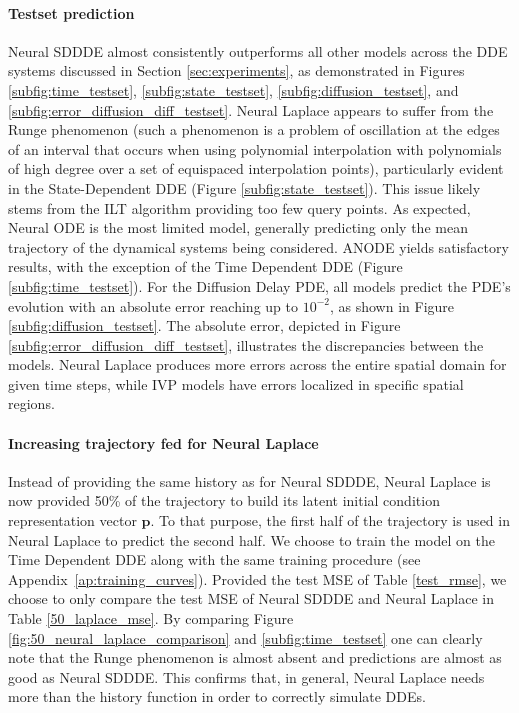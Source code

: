 \documentclass[pmlr]{jmlr}%
\begin{document}

\paragraph{Testset prediction} Neural SDDDE almost consistently outperforms all other models across the DDE systems discussed in Section \ref{sec:experiments}, as demonstrated in Figures \ref{subfig:time_testset}, \ref{subfig:state_testset}, \ref{subfig:diffusion_testset}, and \ref{subfig:error_diffusion_diff_testset}. Neural Laplace appears to suffer from the Runge phenomenon (such a phenomenon is a
problem of oscillation at the edges of an interval that occurs when using polynomial interpolation with polynomials of high degree over a set of equispaced interpolation
points), particularly evident in the State-Dependent DDE (Figure \ref{subfig:state_testset}). This issue likely stems from the ILT algorithm providing too few query points. As expected, Neural ODE is the most limited model, generally predicting only the mean trajectory of the dynamical systems being considered. ANODE yields satisfactory results, with the exception of the Time Dependent DDE (Figure \ref{subfig:time_testset}). For the Diffusion Delay PDE, all models predict the PDE's evolution with an absolute error reaching up to $10^{-2}$, as shown in Figure \ref{subfig:diffusion_testset}. The absolute error, depicted in Figure \ref{subfig:error_diffusion_diff_testset}, illustrates the discrepancies between the models. Neural Laplace produces more errors across the entire spatial domain for given time steps, while IVP models have errors localized in specific spatial regions.

\paragraph{Increasing trajectory fed for Neural Laplace} Instead of providing the same history as for Neural SDDDE, Neural Laplace is now provided 50\% of the trajectory to build its latent initial condition representation vector $\mathbf{p}$. To that purpose, the first half of the trajectory is used in Neural Laplace to predict the second half. We choose to train the model on the Time Dependent DDE along with the same training procedure (see Appendix~\ref{ap:training_curves}). Provided the test MSE of Table \ref{test_rmse}, we choose to only compare the test MSE of Neural SDDDE and Neural Laplace in Table \ref{50_laplace_mse}. By comparing Figure \ref{fig:50_neural_laplace_comparison} and \ref{subfig:time_testset} one can clearly note that the Runge phenomenon is almost absent and predictions are almost as good as Neural SDDDE. This confirms that, in general, Neural Laplace needs more than the history function in order to correctly simulate DDEs. 
\end{document}
